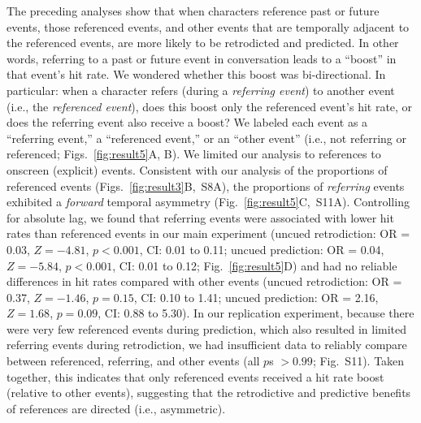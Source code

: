 \documentclass[10pt]{article}
\newcommand{\refEffectRep}{S8}
\newcommand{\referringReferenced}{S11}
\begin{document}
The preceding analyses show that when characters reference past or future events, those referenced events, and other events that are temporally adjacent to the referenced events, are more likely to be retrodicted and predicted. In other words, referring to a past or future event in conversation leads to a ``boost'' in that event's hit rate. We wondered whether this boost was bi-directional. In particular: when a character refers (during a \textit{referring event}) to another event (i.e., the \textit{referenced event}), does this boost only the referenced event's hit rate, or does the referring event also receive a boost? We labeled each event as a ``referring event,'' a ``referenced event,'' or an ``other event'' (i.e., not referring or referenced; Figs.~\ref{fig:result5}A, B). We limited our analysis to references to onscreen (explicit) events. Consistent with our analysis of the proportions of referenced events (Figs.~\ref{fig:result3}B,~\refEffectRep A), the proportions of \textit{referring} events exhibited a \textit{forward} temporal asymmetry (Fig.~\ref{fig:result5}C,~\referringReferenced A). Controlling for absolute lag, we found that referring events were associated with lower hit rates than referenced events in our main experiment (uncued retrodiction: OR = 0.03, $Z = -4.81$, $p < 0.001$, CI: 0.01 to 0.11; uncued prediction: OR = 0.04, $Z = -5.84$, $p < 0.001$, CI: 0.01 to 0.12; Fig.~\ref{fig:result5}D) and had no reliable differences in hit rates compared with other events (uncued retrodiction: OR = 0.37, $Z = -1.46$, $p = 0.15$, CI: 0.10 to 1.41; uncued prediction: OR = 2.16, $Z = 1.68$, $p = 0.09$, CI: 0.88 to 5.30). In our replication experiment, because there were very few referenced events during prediction, which also resulted in limited referring events during retrodiction, we had insufficient data to reliably compare between referenced, referring, and other events (all $p$s $>0.99$; Fig.~\referringReferenced). Taken together, this indicates that only referenced events received a hit rate boost (relative to other events), suggesting that the retrodictive and predictive benefits of references are directed (i.e., asymmetric).
\end{document}
